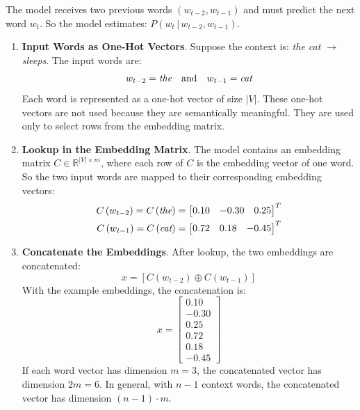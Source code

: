 \highspace
\begin{examplebox}\label{ex:two-word-context}
    The model receives two previous words $\left(w_{t-2}, w_{t-1}\right)$ and must predict the next word $w_t$. So the model estimates: $P\left(w_t \, | \, w_{t-2}, w_{t-1}\right)$.
    \begin{enumerate}
        \item \textbf{Input Words as One-Hot Vectors}. Suppose the context is: \emph{the cat} $\to$ \emph{sleeps}. The input words are:
        \begin{equation*}
            w_{t-2} = \emph{the} \quad \text{and} \quad w_{t-1} = \emph{cat}
        \end{equation*}
        Each word is represented as a one-hot vector of size $\left|V\right|$. These one-hot vectors are not used because they are semantically meaningful. They are used only to select rows from the embedding matrix.


        \item \textbf{Lookup in the Embedding Matrix}. The model contains an embedding matrix $C \in \mathbb{R}^{\left|V\right| \times m}$, where each row of $C$ is the embedding vector of one word. So the two input words are mapped to their corresponding embedding vectors:
        \begin{align*}
            C\left(w_{t-2}\right) = C\left(\emph{the}\right) &= \begin{bmatrix}
                0.10 & -0.30 & 0.25
            \end{bmatrix}^{T} \\
            C\left(w_{t-1}\right) = C\left(\emph{cat}\right) &= \begin{bmatrix}
                0.72 & 0.18 & -0.45
            \end{bmatrix}^{T}
        \end{align*}


        \item \textbf{Concatenate the Embeddings}. After lookup, the two embeddings are concatenated:
        \begin{equation*}
            x = \left[C\left(w_{t-2}\right) \oplus C\left(w_{t-1}\right)\right]
        \end{equation*}
        With the example embeddings, the concatenation is:
        \begin{equation*}
            x = \begin{bmatrix}
                0.10 \\
                -0.30 \\
                0.25 \\
                0.72 \\
                0.18 \\
                -0.45
            \end{bmatrix}
        \end{equation*}
        If each word vector has dimension $m=3$, the concatenated vector has dimension $2m=6$. In general, with $n-1$ context words, the concatenated vector has dimension $(n-1) \cdot m$.



\end{enumerate}
\end{examplebox}
